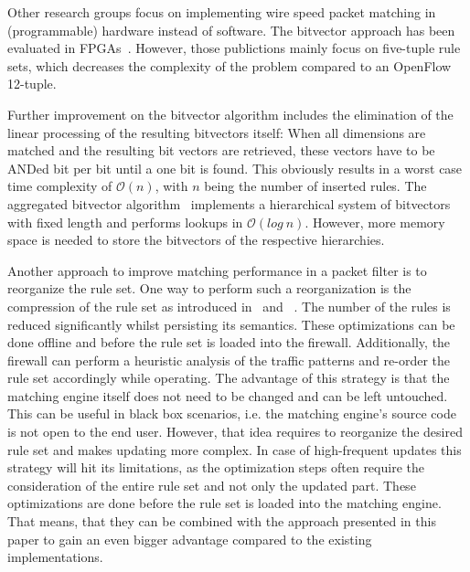 \documentclass[a4paper,
		12pt,
		parskip=full,
		titlepage
		]{scrartcl}
\begin{document}
Other research groups focus on implementing wire speed packet matching in (programmable) hardware instead of software.
The bitvector approach has been evaluated in FPGAs~\cite{bitvector_fpga, qu2013fast}.
However, those publictions mainly focus on five-tuple rule sets, which decreases 
the complexity of the problem compared to an OpenFlow 12-tuple.

Further improvement on the bitvector algorithm includes the elimination of the linear processing of the resulting bitvectors itself:
When all dimensions are matched and the resulting bit vectors are retrieved, 
these vectors have to be ANDed bit per bit until a one bit is found.
This obviously results in a worst case time complexity of $\mathcal O(n)$, with $n$ being the number of inserted rules.
The aggregated bitvector algorithm~\cite{abv} implements a hierarchical system 
of bitvectors with fixed length and performs lookups in $\mathcal O(log\ n)$.
However, more memory space is needed to store the bitvectors of the respective hierarchies.

Another approach to improve matching performance in a packet filter is to reorganize the rule set.
One way to perform such a reorganization is the compression of the rule set as 
introduced in~\cite{redundancy_removal} and ~\cite{firewall_compressor}.
The number of the rules is reduced significantly whilst persisting its semantics.
These optimizations can be done offline and before the rule set is loaded into the firewall.
Additionally, the firewall can perform a heuristic analysis of the traffic patterns and re-order the rule set accordingly while operating.
The advantage of this strategy is that the matching engine itself does not need to be changed and can be left untouched.
This can be useful in black box scenarios, i.e. the matching engine's source code is not open to the end user.
However, that idea requires to reorganize the desired rule set and makes updating more complex.
In case of high-frequent updates this strategy will hit its limitations, 
as the optimization steps often require the consideration of the entire rule set and not only the updated part.
These optimizations are done before the rule set is loaded into the matching engine.
That means, that they can be combined with the approach presented in this paper to
gain an even bigger advantage compared to the existing implementations.
\end{document}
